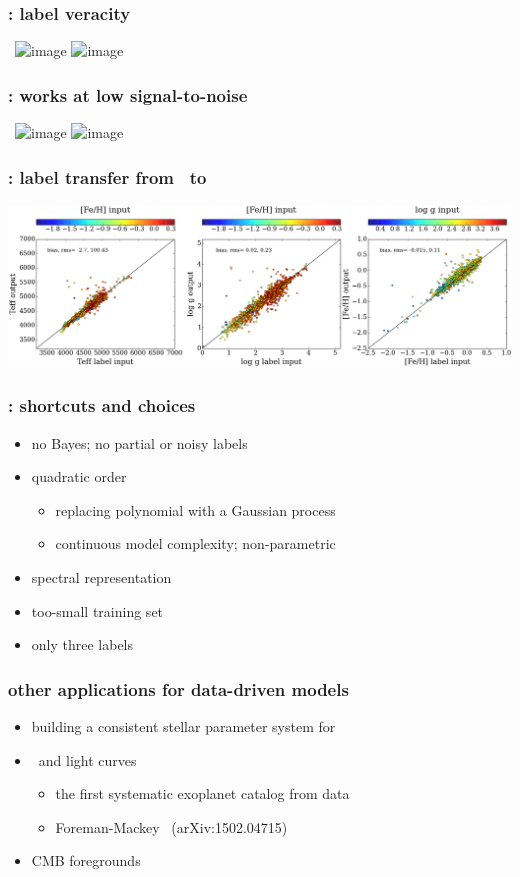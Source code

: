\documentclass[pdftex]{beamer}
\begin{document}
\begin{frame}
  \frametitle{\tc: label veracity}
  ~\hfill\includegraphics<1>[height=\figureheight]{../documents/plots/iso2_2.png}
         \includegraphics<2>[height=\figureheight]{../documents/plots/iso2a_2.png}
\end{frame}

\begin{frame}
  \frametitle{\tc: works at low signal-to-noise}
  ~\hfill\includegraphics<1>[height=\figureheight]{../documents/plots/SNR100to200.png}
         \includegraphics<2>[height=\figureheight]{../documents/plots/SNR20to30.png}
\end{frame}

\begin{frame}
  \frametitle{\tc: label transfer from \apogee\ to }
  \includegraphics[width=\figurewidth]{LAMOST.png}
\end{frame}

\results

\begin{frame}
  \frametitle{\tc: shortcuts and choices}
  \begin{itemize}
  \item no Bayes; no partial or noisy labels
  \item quadratic order
    \begin{itemize}
    \item replacing polynomial with a Gaussian process
    \item continuous model complexity; non-parametric
    \end{itemize}
  \item spectral representation
  \item too-small training set
  \item only three labels
  \end{itemize}
\end{frame}

\begin{frame}
  \frametitle{other applications for data-driven models}
  \begin{itemize}
  \item building a consistent stellar parameter system for \gaia
  \item \kepler\ and  light curves
    \begin{itemize}
    \item the first systematic exoplanet catalog from  data
    \item Foreman-Mackey \etal\ (arXiv:1502.04715)
    \end{itemize}
  \item CMB foregrounds
  \end{itemize}
\end{frame}
\end{document}
